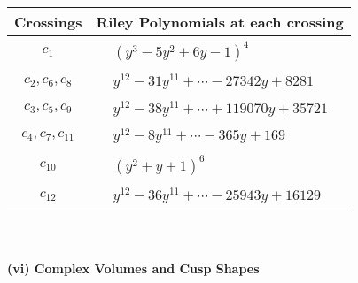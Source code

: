 \documentclass[1p]{elsarticle_modified}
\theoremstyle{definition}
\begin{document}
\begin{tabular}{m{50pt}|m{274pt}}
Crossings & \hspace{64pt}Riley Polynomials at each crossing \\
\hline $$\begin{aligned}c_{1}\end{aligned}$$&$\begin{aligned}
&(y^3-5 y^2+6 y-1)^4
\end{aligned}$\\
\hline $$\begin{aligned}c_{2},c_{6},c_{8}\end{aligned}$$&$\begin{aligned}
&y^{12}-31 y^{11}+\cdots-27342 y+8281
\end{aligned}$\\
\hline $$\begin{aligned}c_{3},c_{5},c_{9}\end{aligned}$$&$\begin{aligned}
&y^{12}-38 y^{11}+\cdots+119070 y+35721
\end{aligned}$\\
\hline $$\begin{aligned}c_{4},c_{7},c_{11}\end{aligned}$$&$\begin{aligned}
&y^{12}-8 y^{11}+\cdots-365 y+169
\end{aligned}$\\
\hline $$\begin{aligned}c_{10}\end{aligned}$$&$\begin{aligned}
&(y^2+y+1)^6
\end{aligned}$\\
\hline $$\begin{aligned}c_{12}\end{aligned}$$&$\begin{aligned}
&y^{12}-36 y^{11}+\cdots-25943 y+16129
\end{aligned}$\\
\hline
\end{tabular}\\~\\
\newpage\flushleft \textbf{(vi) Complex Volumes and Cusp Shapes}
\end{document}

